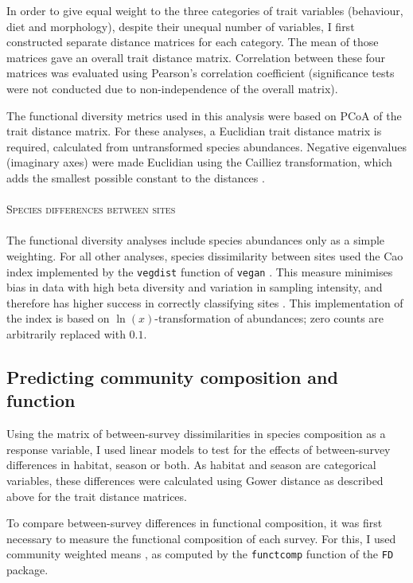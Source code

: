\documentclass[12pt,a4paper]{book}
\begin{document}
In order to give equal weight to the three categories of trait variables (behaviour, diet and morphology), despite their unequal number of variables, I first constructed separate distance matrices for each category. The mean of those matrices gave an overall trait distance matrix. Correlation between these four matrices was evaluated using Pearson's correlation coefficient (significance tests were not conducted due to non-independence of the overall matrix).

The functional diversity metrics used in this analysis were based on PCoA \citep{Laliberte2010} of the trait distance matrix. For these analyses, a Euclidian trait distance matrix is required, calculated from untransformed species abundances. Negative eigenvalues (imaginary axes) were made Euclidian using the Cailliez transformation, which adds the smallest possible constant to the distances \citep{Laliberte2010}.\\
\\
\textsc{Species differences between sites}\\
\\
The functional diversity analyses include species abundances only as a simple weighting. For all other analyses, species dissimilarity between sites used the Cao index implemented by the \texttt{vegdist} function of \texttt{vegan} \citep{Oksanen2016}. This measure minimises bias in data with high beta diversity and variation in sampling intensity, and therefore has higher success in correctly classifying sites \citep{Cao1997}. This implementation of the index is based on $\ln(x)$-transformation of abundances; zero counts are arbitrarily replaced with $0.1$.

\subsection{Predicting community composition and function}

Using the matrix of between-survey dissimilarities in species composition as a response variable, I used linear models to test for the effects of between-survey differences in habitat, season or both. As habitat and season are categorical variables, these differences were calculated using Gower distance as described above for the trait distance matrices.

To compare between-survey differences in functional composition, it was first necessary to measure the functional composition of each survey. For this, I used community weighted means \citep[CWMs:][]{Lavorel2008}, as computed by the \texttt{functcomp} function of the \texttt{FD} package. 
\end{document}
